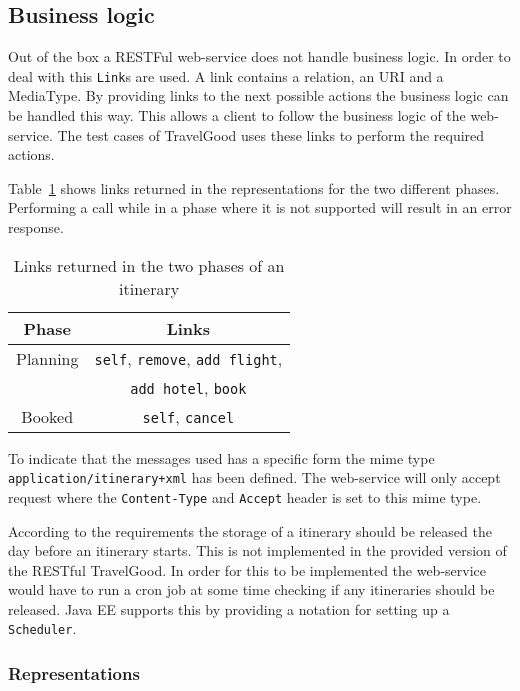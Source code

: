 \subsection{Business logic}
\kim

\noindent
Out of the box a RESTFul web-service does not handle business logic. In order to deal with this \texttt{Link}s are used. A link contains a relation, an URI and a MediaType. By providing links to the next possible actions the business logic can be handled this way. This allows a client to follow the business logic of the web-service. The test cases of TravelGood uses these links to perform the required actions.

Table~\ref{table:rest_business_logic} shows links returned in the representations for the two different phases. Performing a call while in a phase where it is not supported will result in an error response.
\begin{table}
\centering
\begin{tabular}{|c|c|}
\hline
\textbf{Phase} & \textbf{Links} \\
\hline
Planning & \texttt{self}, \texttt{remove}, \texttt{add flight},\\
		 &\texttt{add hotel}, \texttt{book}\\
\hline
Booked & \texttt{self}, \texttt{cancel}\\
\hline
\end{tabular}
\caption{Links returned in the two phases of an itinerary}
\label{table:rest_business_logic}
\end{table}

To indicate that the messages used has a specific form the mime type \texttt{application/itinerary+xml} has been defined. The web-service will only accept request where the \texttt{Content-Type} and \texttt{Accept} header is set to this mime type.

According to the requirements the storage of a itinerary should be released the day before an itinerary starts. This is not implemented in the provided version of the RESTful TravelGood. In order for this to be implemented the web-service would have to run a cron job at some time checking if any itineraries should be released. Java EE supports this by providing a notation for setting up a \texttt{Scheduler}.

\subsubsection{Representations}
\mkt

